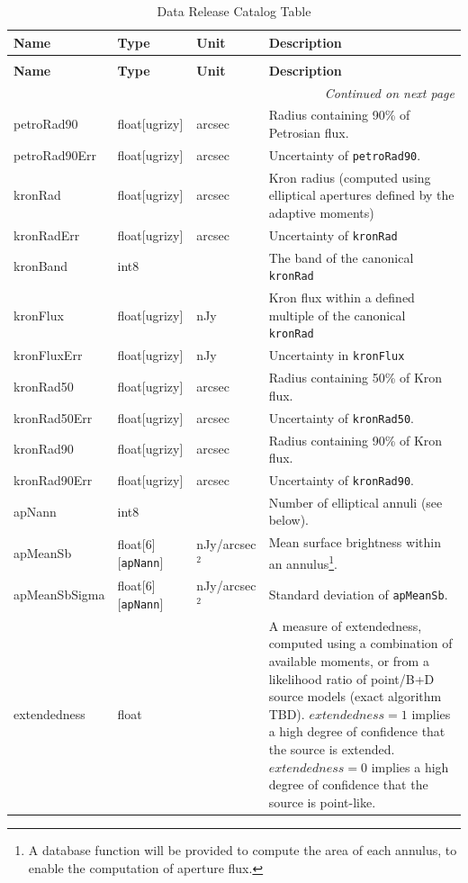 \documentclass[SE,lsstdraft,toc]{lsstdoc}
\newenvironment{schema}[3]{%
\setlength\LTleft{0pt}
\setlength\LTright{\fill}
\begin{longtable}{p{0.2\textwidth}p{0.14\textwidth}p{0.14\textwidth}p{0.41\textwidth}}

\caption[#1]{#2\label{#3}}\\

\hline \textbf{Name} & \textbf{Type} & \textbf{Unit} & \textbf{Description}\\ \hline
\endfirsthead

\caption[#1]{#2}\\

\hline \textbf{Name} & \textbf{Type} & \textbf{Unit} & \textbf{Description}\\ \hline
\endhead

\hline \multicolumn{4}{r}{\emph{Continued on next page}} \\
\endfoot

\hline\hline
\endlastfoot
}{%
\hline
\end{longtable}
}
\begin{document}
\begin{schema}{\Object Table}{Data Release Catalog \Object Table}{tbl:objectTable}
petroRad90 & float[ugrizy] & arcsec & Radius containing 90\% of Petrosian flux. \\

petroRad90Err & float[ugrizy] & arcsec & Uncertainty of \texttt{petroRad90}. \\


kronRad & float[ugrizy] & arcsec & Kron radius (computed using elliptical apertures defined by the adaptive moments) \\

kronRadErr & float[ugrizy] & arcsec & Uncertainty of \texttt{kronRad} \\

kronBand & int8 & ~ & The band of the canonical \texttt{kronRad} \\

kronFlux & float[ugrizy] & nJy & Kron flux within a defined multiple of the canonical \texttt{kronRad} \\

kronFluxErr & float[ugrizy] & nJy & Uncertainty in \texttt{kronFlux} \\

kronRad50 & float[ugrizy] & arcsec & Radius containing 50\% of Kron flux. \\

kronRad50Err & float[ugrizy] & arcsec & Uncertainty of \texttt{kronRad50}. \\

kronRad90 & float[ugrizy] & arcsec & Radius containing 90\% of Kron flux. \\

kronRad90Err & float[ugrizy] & arcsec & Uncertainty of \texttt{kronRad90}. \\


apNann & int8 & ~ & Number of elliptical annuli (see below). \\

apMeanSb & float[6][\texttt{apNann}] & nJy/arcsec$^2$ & Mean surface brightness within an annulus\footnote{A database function will be provided to compute the area of each annulus, to enable the computation of aperture flux.}. \\

apMeanSbSigma & float[6][\texttt{apNann}] & nJy/arcsec$^2$ & Standard deviation of \texttt{apMeanSb}. \\

extendedness & float & ~ & A measure of extendedness, computed using a combination of available moments, or from a likelihood ratio of point/B+D source models (exact algorithm TBD). $extendedness=1$ implies a high degree of confidence that the source is extended. $extendedness=0$ implies a high degree of confidence that the source is point-like. \\


\end{schema}
\end{document}
